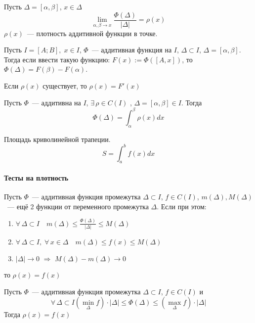 \documentclass[12pt]{../../notes}
\begin{document}
\begin{defn}\label{defn:pointdens} 
  Пусть $\Delta=[\alpha,\beta]$, $x \in \Delta$
  \[
    \lim_{\alpha,\beta \to x}\frac{\Phi(\Delta)}{|\Delta|} = \rho(x)
  \]
  $\rho(x)$~--- плотность аддитивной функции в точке.
\end{defn}

\begin{stat}
  Пусть $I = [A;B],\; x \in I$, $\Phi$~--- аддитивная функция на $I$, $\Delta \subset I$, $\Delta=[\alpha,\beta]$.
  Тогда если ввести такую функцию: $F(x) := \Phi([A,x])$, то $\Phi(\Delta) = F(\beta)-F(\alpha)$.
\end{stat}
{\lem\label{lem:densderiv} Если $\rho(x)$ существует, то $\rho(x) = F'(x)$}
\begin{lem}\label{lem:addintdens}
  Пусть $\Phi$~--- аддитивна на $I$, $\exists\, \rho \in C(I)$ , $\Delta = [\alpha,\beta]\in I$. Тогда
  \[
    \Phi(\Delta) = \int_\alpha^\beta \rho(x) dx
  \]
\end{lem}
\begin{exmp}
  Площадь криволинейной трапеции.
  \[
    S = \int_a^b f(x) dx
  \]
\end{exmp}

\paragraph{Тесты на плотность}

\begin{stat}\label{stat:denstest1}
  Пусть $\Phi$~--- аддитивная функция промежутка $\Delta \subset I$, 
  $f\in C(I)$, $m(\Delta), M(\Delta)$~--- ещё 2 функции от переменного промежутка $\Delta$. Если при этом:
  \begin{enumerate}
    \item $\forall\, \Delta \subset I \quad m(\Delta) \leqslant \frac{\Phi(\Delta)}{|\Delta|} \leqslant M(\Delta)$
    \item $\forall\, \Delta \subset I, \; \forall\, x\in \Delta \quad m(\Delta) \leqslant f(x) \leqslant M(\Delta)$
    \item $|\Delta|\to 0$ $\Rightarrow$ $M(\Delta) - m(\Delta) \to 0$
  \end{enumerate}
  то $\rho(x) = f(x)$
\end{stat}

\begin{stat}\label{stat:denstest2}
  Пусть $\Phi$~--- аддитивная функция промежутка $\Delta \subset I$, $f\in C(I)$ и 
  \[
    \forall\, \Delta \subset I \left( \min_\Delta f \right) \cdot |\Delta| 
    \leqslant \Phi(\Delta) \leqslant \left( \max_\Delta f \right)\cdot |\Delta|
  \] Тогда $\rho(x) = f(x) $
\end{stat}
  
\end{document}
